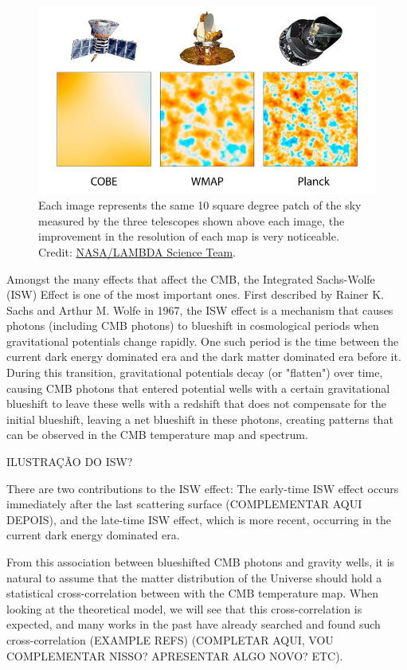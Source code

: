\documentclass[openany,a4paper,12pt,oneside]{book}
\begin{document}
\begin{spacing}{1.5}
\begin{figure}
    \centering
    \includegraphics[width=.7\linewidth]{Imagens/satellites.jpg}
    \caption{Each image represents the same 10 square degree patch of the sky measured by the three telescopes shown above each image, the improvement in the resolution of each map is very noticeable. Credit: \href{https://lambda.gsfc.nasa.gov/education/graphic_history/microwaves.html}{NASA/LAMBDA Science Team}.}
    \label{fig:cmb_satellites}
\end{figure}

Amongst the many effects that affect the CMB, the Integrated Sachs-Wolfe (ISW) Effect is one of the most important ones. First described by Rainer K. Sachs and Arthur M. Wolfe in 1967, the ISW effect is a mechanism that causes photons (including CMB photons) to blueshift in cosmological periods when gravitational potentials change rapidly. One such period is the time between the current dark energy dominated era and the dark matter dominated era before it. During this transition, gravitational potentials decay (or "flatten") over time, causing CMB photons that entered potential wells with a certain gravitational blueshift to leave these wells with a redshift that does not compensate for the initial blueshift, leaving a net blueshift in these photons, creating patterns that can be observed in the CMB temperature map and spectrum\cite{Sachs:1967er}.

ILUSTRAÇÃO DO ISW?

There are two contributions to the ISW effect: The early-time ISW effect occurs immediately after the last scattering surface (COMPLEMENTAR AQUI DEPOIS), and the late-time ISW effect, which is more recent, occurring in the current dark energy dominated era. 

From this association between blueshifted CMB photons and gravity wells, it is natural to assume that the matter distribution of the Universe should hold a statistical cross-correlation between with the CMB temperature map. When looking at the theoretical model, we will see that this cross-correlation is expected, and many works in the past have already searched and found such cross-correlation (EXAMPLE REFS) (COMPLETAR AQUI, VOU COMPLEMENTAR NISSO? APRESENTAR ALGO NOVO? ETC). 


\end{spacing}
\end{document}
